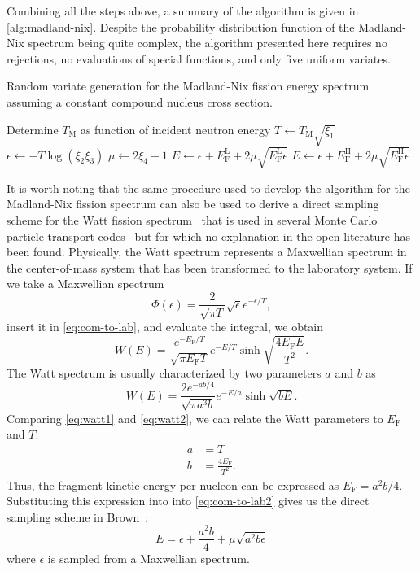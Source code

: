 \documentclass[5p]{elsarticle}
\newcommand{\tmax}{T_{\mathrm{M}}}
\newcommand{\ef}{E_{\mathrm{F}}}
\newcommand{\efl}{E_{\mathrm{F}}^{\mathrm{L}}}
\newcommand{\efh}{E_{\mathrm{F}}^{\mathrm{H}}}
\begin{document}
Combining all the steps above, a summary of the algorithm is given in
\autoref{alg:madland-nix}. Despite the probability distribution function of the
Madland-Nix spectrum being quite complex, the algorithm presented here requires
no rejections, no evaluations of special functions, and only five uniform
variates.
\begin{algorithm}
  \caption{Random variate generation for the Madland-Nix fission energy spectrum
    assuming a constant compound nucleus cross section.}
  \label{alg:madland-nix}
  \begin{algorithmic}[1]
    \State Determine $\tmax$ as function of incident neutron energy
    \State $T \gets \tmax \sqrt{\xi_1}$
    \State $\epsilon \gets - T \log(\xi_2 \xi_3)$
    \State $\mu \gets 2\xi_4 - 1$
      \State $E \gets \epsilon + \efl + 2\mu \sqrt{\efl \epsilon}$
    \Else
      \State $E \gets \epsilon + \efh + 2\mu \sqrt{\efh \epsilon}$
    \EndIf
  \end{algorithmic}
\end{algorithm}

It is worth noting that the same procedure used to develop the algorithm for the
Madland-Nix fission spectrum can also be used to derive a direct sampling scheme
for the Watt fission spectrum~\cite{lanl-brown-2005} that is used in several
Monte Carlo particle transport codes~\cite{snamc-griesheimer-2013,
  ane-romano-2013} but for which no explanation in the open literature has been
found. Physically, the Watt spectrum represents a Maxwellian spectrum in the
center-of-mass system that has been transformed to the laboratory system. If we
take a Maxwellian spectrum
\begin{equation*}
  \Phi(\epsilon) = \frac{2}{\sqrt{\pi T}} \sqrt{\epsilon} e^{-\epsilon/T},
\end{equation*}
insert it in \autoref{eq:com-to-lab}, and evaluate the integral, we obtain
\begin{equation}
  W(E) = \frac{e^{-\ef/T}}{\sqrt{\pi \ef T}} e^{-E/T} \sinh \sqrt{\frac{4\ef
      E}{T^2}}.
  \label{eq:watt1}
\end{equation}
The Watt spectrum is usually characterized by two parameters $a$ and $b$ as
\begin{equation}
  W(E) = \frac{2e^{-ab/4}}{\sqrt{\pi a^3 b}} e^{-E/a} \sinh \sqrt{bE}.
  \label{eq:watt2}
\end{equation}
Comparing \autoref{eq:watt1} and \autoref{eq:watt2}, we can relate the Watt
parameters to $\ef$ and $T$:
\begin{align*}
  a &= T \\
  b &= \frac{4\ef}{T^2}.
\end{align*}
Thus, the fragment kinetic energy per nucleon can be expressed as $\ef =
a^2b/4$. Substituting this expression into into \autoref{eq:com-to-lab2} gives us
the direct sampling scheme in Brown~\cite{lanl-brown-2005}:
\begin{equation*}
  E = \epsilon + \frac{a^2b}{4} + \mu \sqrt{a^2 b \epsilon}
\end{equation*}
where $\epsilon$ is sampled from a Maxwellian spectrum.
\end{document}
